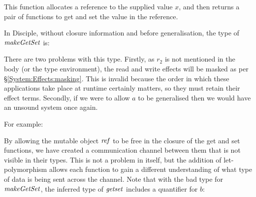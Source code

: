 
This function allocates a reference to the supplied value $x$, and then returns a pair of functions to get and set the value in the reference. 

\clearpage{}
In Disciple, without closure information and before generalisation, the type of $\operatorname{\mathit{makeGetSet}}$ is:


There are two problems with this type. Firstly, as $r_2$ is not mentioned in the body (or the type environment), the read and write effects will be masked as per \S\ref{System:Effects:masking}. This is invalid because the order in which these applications take place at runtime certainly matters, so they must retain their effect terms. Secondly, if we were to allow $a$ to be generalised then we would have an unsound system once again. 

For example:




By allowing the mutable object $\operatorname{\mathit{ref}}$ to be free in the closure of the get and set functions, we have created a communication channel between them that is not visible in their types. This is not a problem in itself, but the addition of let-polymorphism allows each function to gain a different understanding of what type of data is being sent across the channel. Note that with the bad type for $\operatorname{\mathit{makeGetSet}}$, the inferred type of $\operatorname{\mathit{getset}}$ includes a quantifier for $b$:

